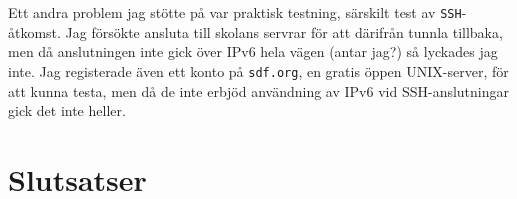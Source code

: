 Ett andra problem jag stötte på var praktisk testning, särskilt test av
\texttt{SSH}-åtkomst.  Jag försökte ansluta till skolans servrar för att
därifrån tunnla tillbaka, men då anslutningen inte gick över IPv6 hela vägen
(antar jag?) så lyckades jag inte.  Jag registerade även ett konto på
\texttt{sdf.org}, en gratis öppen UNIX-server, för att kunna testa, men då de
inte erbjöd användning av IPv6 vid SSH-anslutningar gick det inte heller.


\section{Slutsatser}

